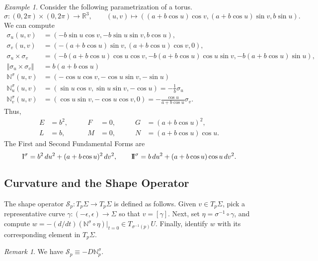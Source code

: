 \documentclass[11pt]{article}
\newcommand{\R}{\mathbb{R}}
\newcommand{\N}{\mathbb{N}}
\newcommand{\I}{{\rm I}}
\newcommand{\II}{{\rm I\!I}}
\newcommand{\norm}[1]{\Vert #1 \Vert}
\theoremstyle{definition}
\theoremstyle{remark}
\newtheorem*{remark}{Remark}
\newtheorem*{example}{Example}
\numberwithin{equation}{section}
\begin{document}
    \begin{example}
        Consider the following parametrization of a torus. \[
            \sigma\colon (0, 2\pi)\times (0, 2\pi) \to \R^3, \qquad
            (u, v) \mapsto ((a + b\cos{u})\cos{v}, (a + b\cos{u})\sin{v}, b\sin{u}).
        \] We can compute \begin{align*}
            \sigma_u(u, v) &= (-b\sin{u}\cos{v}, -b\sin{u}\sin{v}, b\cos{u}), \\
            \sigma_v(u, v) &= (-(a + b\cos{u})\sin{v}, (a + b\cos{u})\cos{v}, 0), \\
            \sigma_u\times\sigma_v &= (-b(a + b\cos{u})\cos{u}\cos{v}, -b(a +
            b\cos{u})\cos{u}\sin{v}, -b(a + b\cos{u})\sin{u}), \\
            \norm{\sigma_u\times\sigma_v} &= b(a + b\cos{u}) \\
            \N^\sigma(u, v) &= (-\cos{u}\cos{v},
            -\cos{u}\sin{v}, -\sin{u}) \\
            \N^\sigma_u(u, v) &= (\sin{u}\cos{v}, \sin{u}\sin{v}, -\cos{u}) =
            -\frac{1}{b}\sigma_u\\
            \N^\sigma_v(u, v) &= (\cos{u}\sin{v}, -\cos{u}\cos{v}, 0) =
            -\frac{\cos{u}}{a + b\cos{u}}\sigma_v.
        \end{align*}
        Thus, \begin{align*}
            E &= b^2, &\qquad F &= 0, &\qquad G &= (a + b\cos{u})^2, \\
            L &= b, &\qquad M &= 0, &\qquad N &= (a + b\cos{u})\cos{u}.
        \end{align*}
        The First and Second Fundamental Forms are \[
            \I^\sigma = b^2\,du^2 + (a + b\cos{u})^2\,dv^2, \qquad
            \II^\sigma = b\,du^2 + (a + b\cos{u})\cos{u}\,dv^2.
        \]
    \end{example}

    \subsection{Curvature and the Shape Operator}
    
    \begin{definition}
        The shape operator $\mathscr{S}_p\colon T_p\Sigma \to T_p\Sigma$ is defined
        as follows. Given $v \in T_p\Sigma$, pick a representative curve
        $\gamma\colon (-\epsilon, \epsilon) \to \Sigma$ so that $v = [\gamma]$. Next,
        set $\eta = \sigma^{-1}\circ \gamma$, and compute $w = -(d /
        dt)(\N^\sigma\circ \eta)\big|_{t = 0} \in T_{\sigma^{-1}(p)}U$. Finally,
        identify $w$ with its corresponding element in $T_p\Sigma$.

        \begin{remark}
            We have $\mathscr{S}_p \equiv -D\N^{\sigma}_p$.
        \end{remark}
    \end{definition}
\end{document}
